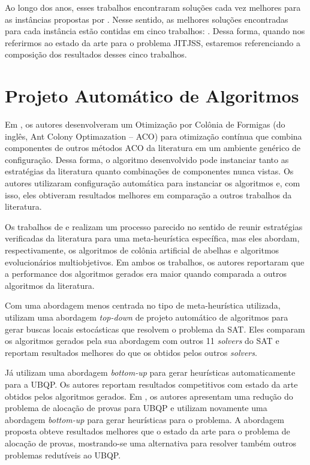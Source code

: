 Ao longo dos anos, esses trabalhos encontraram soluções cada vez melhores para as instâncias propostas por \cite{baptiste2008lagrangian}. Nesse sentido, as melhores soluções encontradas para cada instância estão contidas em cinco trabalhos: \cite{dos2010combination, wang2014variable, ahmadian2021meta, abderrazzak2022adaptive, sabri2023reinforcement}. Dessa forma, quando nos referirmos ao estado da arte para o problema \ac{JITJSS}, estaremos referenciando a composição dos resultados desses cinco trabalhos.

\section{Projeto Automático de Algoritmos} \label{sect:bibconfig}

Em \cite{liao2014unified}, os autores desenvolveram um Otimização por Colônia de Formigas
(do inglês, Ant Colony Optimazation -- \acs{ACO}) para otimização contínua que combina componentes de outros métodos \ac{ACO} da literatura em um ambiente genérico de configuração. Dessa forma, o algoritmo desenvolvido pode instanciar tanto as estratégias da literatura quanto combinações de componentes nunca vistas. Os autores utilizaram configuração automática para instanciar os algoritmos e, com isso, eles obtiveram resultados melhores em comparação a outros trabalhos da literatura.

Os trabalhos de \cite{aydin2017abc} e \cite{bezerra2020automatically} realizam um processo parecido no sentido de reunir estratégias verificadas da literatura para uma meta-heurística específica, mas eles abordam, respectivamente, os algoritmos de colônia artificial de abelhas e algoritmos evolucionários multiobjetivos. Em ambos os trabalhos, os autores reportaram que a performance dos algoritmos gerados era maior quando comparada a outros algoritmos da literatura.

Com uma abordagem menos centrada no tipo de meta-heurística utilizada, \cite{khudabukhsh2016satenstein} utilizam uma abordagem \textit{top-down} de projeto automático de algoritmos para gerar buscas locais estocásticas que resolvem o problema da \ac{SAT}. Eles comparam os algoritmos gerados pela sua abordagem com outros 11 \textit{solvers} do \ac{SAT} e reportam resultados melhores do que os obtidos pelos outros \textit{solvers}. 

Já \cite{de2018automatic} utilizam uma abordagem \textit{bottom-up} para gerar heurísticas automaticamente para a \ac{UBQP}. Os autores reportam resultados competitivos com estado da arte obtidos pelos algoritmos gerados. Em \cite{de2018automatically}, os autores apresentam uma redução do problema de alocação de provas para \ac{UBQP} e utilizam novamente uma abordagem \textit{bottom-up} para gerar heurísticas para o problema. A abordagem proposta obteve resultados melhores que o estado da arte para o problema de alocação de provas, mostrando-se uma alternativa para resolver também outros problemas redutíveis ao \ac{UBQP}.

